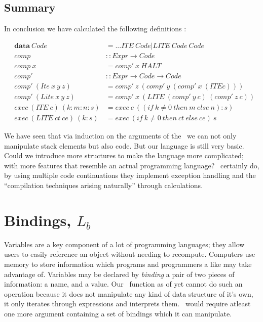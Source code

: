 \documentclass {article}
\begin{document}
\subsection{Summary}

In conclusion we have calculated the following definitions
												\cite[page 11]{bandh}:

\begin{eqnarray*}
	&\textbf{data} \ Code &= ...ITE\ Code | LITE\ Code\ Code \\
	&comp 				  &:: Expr \rightarrow Code \\
	&comp\ x			  &= comp'\ x\ HALT \\
	&comp'				  &:: Expr \rightarrow Code \rightarrow Code \\
	&comp'\ (Ite\ x\ y\ z) 
				&= comp'\ z\ (comp' \ y\ (comp' \ x\ (ITE c))) \\
	&comp'\ (Lite\ x\ y\ z) 
				&= comp'\ x\ (LITE\ (comp'\ y\ c)\ (comp'\ z\ c)) \\
	&exec\ (ITE\ c)\ (k:m:n:s) 
						&= exec\ c\ ((if\ k \not=0\ then\ m\ else\ n):s) \\
	&exec\ (LITE\ ct\ ce)\ (k:s) 
						&= exec\ (if\ k \not=0\ then\ ct\ else\ ce)\ s
\end{eqnarray*}

We have seen that via 
induction on the arguments of the 
\vm\ we can not only manipulate
stack elements but also code.
But our language is still very
basic.
Could we introduce more structures
to make the language more complicated;
with more features that resemble
an actual programming language?
\BH\ certainly do, by using 
multiple code continuations they
implement exception handling and the
``compilation techniques arising naturally''
through calculations\cite[page 24]{bandh}.

\section{Bindings, $L_b$}

Variables are a key component
of a lot of programming languages;
they allow users to easily reference
an object without needing to recompute.
Computers use memory to store information
which programs and programmers a like may
take advantage of.
Variables may be declared by \emph{binding}
a pair of two pieces of information:
a name, and a value.
Our \eval\ function as of yet 
cannot do such an operation
because it does not manipulate any kind of
data structure of it's own,
it only iterates through
expressions and interprets them.
\eval\ would require atleast one more argument
containing a set of bindings which it can
manipulate.
\end{document}

